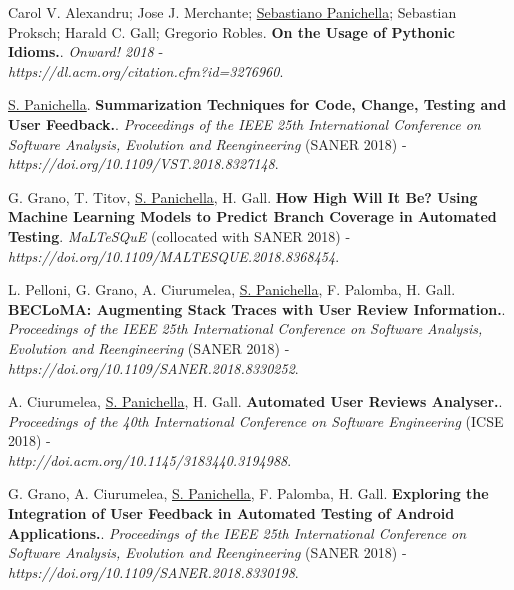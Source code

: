\documentclass[10pt]{article}
\begin{document}
\begin{bibenum}
      \item \label{Cm8}  Carol V. Alexandru; Jose J. Merchante; \underline{Sebastiano Panichella}; Sebastian Proksch; Harald C. Gall; Gregorio Robles. \textbf{On the Usage of Pythonic Idioms.}.  \emph{Onward! 2018} - \\\textit{https://dl.acm.org/citation.cfm?id=3276960}. %
 \item \label{Cm7}  \underline{S. Panichella}. \textbf{Summarization Techniques for Code, Change, Testing and User Feedback.}.  \emph{Proceedings of the  {IEEE} 25th International Conference on Software Analysis, Evolution
               and Reengineering}  (SANER 2018) - \\\textit{https://doi.org/10.1109/VST.2018.8327148}. %
   \item \label{Cm6}  G. Grano, T. Titov, \underline{S. Panichella}, H. Gall. \textbf{How High Will It Be? Using Machine Learning Models to Predict Branch Coverage in Automated Testing}.  \emph{MaLTeSQuE}  (collocated with SANER 2018) - \\\textit{https://doi.org/10.1109/MALTESQUE.2018.8368454}. %
  \item \label{Cm5}  L. Pelloni, G. Grano, A. Ciurumelea, \underline{S. Panichella}, F. Palomba, H. Gall. \textbf{BECLoMA: Augmenting Stack Traces with User Review Information.}.  \emph{Proceedings of the  {IEEE} 25th International Conference on Software Analysis, Evolution
               and Reengineering}  (SANER 2018) - \\\textit{https://doi.org/10.1109/SANER.2018.8330252}. %
    \item \label{Cm4} A. Ciurumelea, \underline{S. Panichella}, H. Gall. \textbf{Automated User Reviews Analyser.}.  \emph{Proceedings of the  40th International Conference on Software Engineering}  (ICSE 2018) - \\\textit{http://doi.acm.org/10.1145/3183440.3194988}. %

      \item \label{Cm3}  G. Grano, A. Ciurumelea, \underline{S. Panichella}, F. Palomba, H. Gall. \textbf{ Exploring the Integration of User Feedback in Automated Testing of Android Applications.}.  \emph{Proceedings of the  {IEEE} 25th International Conference on Software Analysis, Evolution
               and Reengineering}  (SANER 2018) - \\\textit{https://doi.org/10.1109/SANER.2018.8330198}. %



\end{bibenum}
\end{document}
